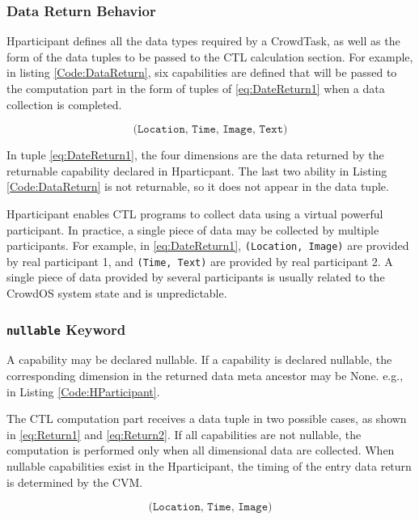 \subsubsection{Data Return Behavior}
Hparticipant defines all the data types required by a CrowdTask, as well as the form of the data tuples to be passed to the CTL calculation section. For example, in listing \ref{Code:DataReturn}, six capabilities are defined that will be passed to the computation part in the form of tuples of \ref{eq:DateReturn1} when a data collection is completed.

\begin{equation}\label{eq:DateReturn1}
    \texttt{(Location, Time, Image, Text)}
\end{equation}

In tuple \ref{eq:DateReturn1}, the four dimensions are the data returned by the returnable capability declared in Hparticpant. The last two ability in Listing \ref{Code:DataReturn} is not returnable, so it does not appear in the data tuple.

Hparticipant enables CTL programs to collect data using a virtual powerful participant. In practice, a single piece of data may be collected by multiple participants. For example, in \ref{eq:DateReturn1}, \texttt{(Location, Image)} are provided by real participant 1, and \texttt{(Time, Text)} are provided by real participant 2. A single piece of data provided by several participants is usually related to the CrowdOS system state and is unpredictable.

\subsubsection{\texttt{nullable} Keyword}

A capability may be declared nullable. If a capability is declared nullable, the corresponding dimension in the returned data meta ancestor may be None. e.g., in Listing \ref{Code:HParticipant}.

The CTL computation part receives a data tuple in two possible cases, as shown in \ref{eq:Return1} and \ref{eq:Return2}. If all capabilities are not nullable, the computation is performed only when all dimensional data are collected. When nullable capabilities exist in the Hparticipant, the timing of the entry data return is determined by the CVM.

\begin{equation}\label{eq:Return1}
    \texttt{(Location, Time, Image)}
\end{equation}

